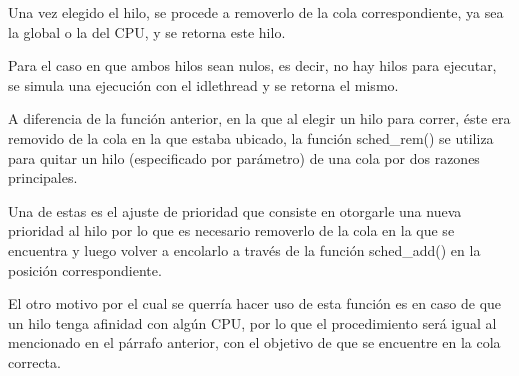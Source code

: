 Una vez elegido el hilo, se procede a removerlo de la cola correspondiente, ya sea la global o la del CPU, y se retorna este hilo.

Para el caso en que ambos hilos sean nulos, es decir, no hay hilos para ejecutar, se simula una ejecución con el idlethread y se retorna el mismo.

A diferencia de la función anterior, en la que al elegir un hilo para correr, éste era removido de la cola en la que estaba ubicado, la función sched\_rem() se utiliza para quitar un hilo (especificado por parámetro) de una cola por dos razones principales.\par

Una de estas es el ajuste de prioridad que consiste en otorgarle una nueva prioridad al hilo por lo que es necesario removerlo de la cola en la que se encuentra y luego volver a encolarlo a través de la función sched\_add() en la posición correspondiente.\par

El otro motivo por el cual se querría hacer uso de esta función es en caso de que un hilo tenga afinidad con algún CPU, por lo que el procedimiento será igual al mencionado en el párrafo anterior, con el objetivo de que se encuentre en la cola correcta.\par


